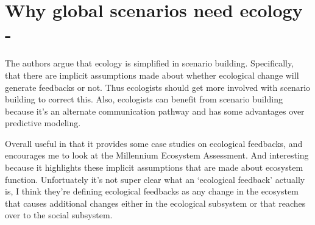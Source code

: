 \documentclass[a4paper,10pt]{report}
\begin{document}
\section*{Why global scenarios need ecology - \cite{Bennettetal:2003}}
The authors argue that ecology is simplified in scenario building. Specifically, that there are implicit assumptions made about whether ecological change will generate feedbacks or not. Thus ecologists should get more involved with scenario building to correct this. Also, ecologists can benefit from scenario building because it's an alternate communication pathway and has some advantages over predictive modeling. 

Overall useful in that it provides some case studies on ecological feedbacks, and encourages me to look at the Millennium Ecosystem Assessment. And interesting because it highlights these implicit assumptions that are made about ecosystem function. Unfortuately it's not super clear what an `ecological feedback' actually is, I think they're defining ecological feedbacks as any change in the ecosystem that causes additional changes either in the ecological subsystem or that reaches over to the social subsystem. 
\end{document}
